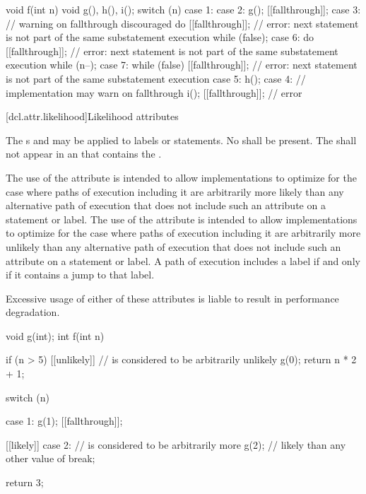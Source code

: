 \pnum
\begin{example}
\begin{codeblock}
void f(int n) {
  void g(), h(), i();
  switch (n) {
  case 1:
  case 2:
    g();
    [[fallthrough]];
  case 3:                       // warning on fallthrough discouraged
    do {
      [[fallthrough]];          // error: next statement is not part of the same substatement execution
    } while (false);
  case 6:
    do {
      [[fallthrough]];          // error: next statement is not part of the same substatement execution
    } while (n--);
  case 7:
    while (false) {
      [[fallthrough]];          // error: next statement is not part of the same substatement execution
    }
  case 5:
    h();
  case 4:                       // implementation may warn on fallthrough
    i();
    [[fallthrough]];            // error
  }
}
\end{codeblock}
\end{example}

[dcl.attr.likelihood]{Likelihood attributes}%

\pnum
The s
 and 
may be applied to labels or statements.
No  shall be present.
The  
shall not appear in an 
that contains the  .

\pnum
\recommended
The use of the  attribute
is intended to allow implementations to optimize for
the case where paths of execution including it
are arbitrarily more likely
than any alternative path of execution
that does not include such an attribute on a statement or label.
The use of the  attribute
is intended to allow implementations to optimize for
the case where paths of execution including it
are arbitrarily more unlikely
than any alternative path of execution
that does not include such an attribute on a statement or label.
A path of execution includes a label
if and only if it contains a jump to that label.
\begin{note}
Excessive usage of either of these attributes
is liable to result in performance degradation.
\end{note}

\pnum
\begin{example}
\begin{codeblock}
void g(int);
int f(int n) {
  if (n > 5) [[unlikely]] {     //  is considered to be arbitrarily unlikely
    g(0);
    return n * 2 + 1;
  }

  switch (n) {
  case 1:
    g(1);
    [[fallthrough]];

  [[likely]] case 2:            //  is considered to be arbitrarily more
    g(2);                       // likely than any other value of 
    break;
  }
  return 3;
}
\end{codeblock}
\end{example}

